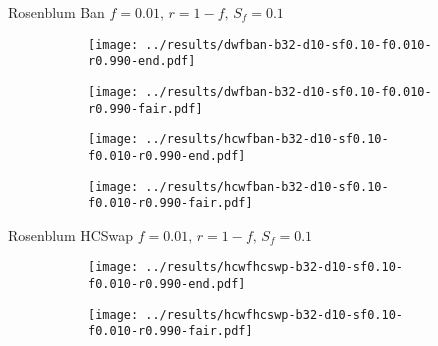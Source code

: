 \documentclass[8pt,a4paper]{beamer}
\begin{document}
	
\begin{frame}{Rosenblum Ban $f=0.01,\, r=1-f,\,S_f=0.1$}
	\begin{figure}
		\begin{subfigure}{.48\textwidth}
			\centering
			\texttt{[image: ../results/dwfban-b32-d10-sf0.10-f0.010-r0.990-end.pdf]}
		\end{subfigure}
		\begin{subfigure}{.48\textwidth}
			\centering
			\texttt{[image: ../results/dwfban-b32-d10-sf0.10-f0.010-r0.990-fair.pdf]}
		\end{subfigure}
	\end{figure}
	
	\begin{figure}
		\begin{subfigure}{.48\textwidth}
			\centering
			\texttt{[image: ../results/hcwfban-b32-d10-sf0.10-f0.010-r0.990-end.pdf]}
		\end{subfigure}
		\begin{subfigure}{.48\textwidth}
			\centering
			\texttt{[image: ../results/hcwfban-b32-d10-sf0.10-f0.010-r0.990-fair.pdf]}
		\end{subfigure}
	\end{figure}
\end{frame}

\begin{frame}{Rosenblum HCSwap $f=0.01,\, r=1-f,\,S_f=0.1$}
	\begin{figure}
		\begin{subfigure}{.48\textwidth}
			\centering
			\texttt{[image: ../results/hcwfhcswp-b32-d10-sf0.10-f0.010-r0.990-end.pdf]}
		\end{subfigure}
		\begin{subfigure}{.48\textwidth}
			\centering
			\texttt{[image: ../results/hcwfhcswp-b32-d10-sf0.10-f0.010-r0.990-fair.pdf]}
		\end{subfigure}
	\end{figure}
\end{frame}
\end{document}
